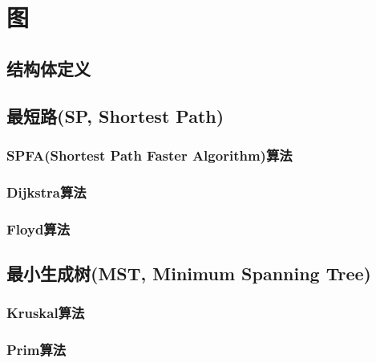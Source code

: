 
\chapter{图}
\section{结构体定义}

\section{最短路(SP, Shortest Path)}
\subsection{SPFA(Shortest Path Faster Algorithm)算法}
\subsection{Dijkstra算法}
\subsection{Floyd算法}

\section{最小生成树(MST, Minimum Spanning Tree)}
\subsection{Kruskal算法}
\subsection{Prim算法}

